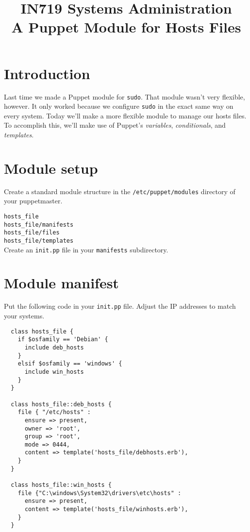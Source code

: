 \documentclass{article}   	%
\title{IN719 Systems Administration\\A Puppet Module for Hosts Files}
\date{}							%
\begin{document}
\maketitle

\section*{Introduction}
Last time we made a Puppet module for \texttt{sudo}.  That module wasn't very flexible, however.  It only worked because we configure \texttt{sudo} in the exact same way on every system. Today we'll make a more flexible module to manage our hosts files.  To accomplish this, we'll make use of Puppet's \emph{variables}, \emph{conditionals}, and \emph{templates}.

\section{Module setup}
Create a standard module structure in the \texttt{/etc/puppet/modules} directory of your puppetmaster.

\texttt{hosts\_file} \\
\texttt{hosts\_file/manifests} \\
\texttt{hosts\_file/files} \\
\texttt{hosts\_file/templates} \\

Create an \texttt{init.pp} file in your \texttt{manifests} subdirectory.

\section{Module manifest}
Put the following code in your \texttt{init.pp} file.  Adjust the IP addresses to match your systems.

\begin{verbatim}
  class hosts_file {
    if $osfamily == 'Debian' {
      include deb_hosts
    }
    elsif $osfamily == 'windows' {
      include win_hosts
    }
  }

  class hosts_file::deb_hosts {
    file { "/etc/hosts" :
      ensure => present,
      owner => 'root',
      group => 'root',
      mode => 0444,
      content => template('hosts_file/debhosts.erb'),
    }
  }

  class hosts_file::win_hosts {
    file {"C:\windows\System32\drivers\etc\hosts" :
      ensure => present,
      content => template('hosts_file/winhosts.erb'),
    }
  }
  
\end{verbatim}
\end{document}
